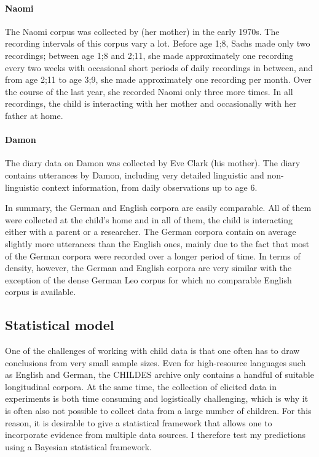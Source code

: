 \documentclass[lucida]{sp} %
\begin{document}
\paragraph{Naomi} The Naomi corpus was collected by \cite{sachs1983} (her mother) in the early 1970s. The recording intervals of this corpus vary a lot. Before age 1;8, Sachs made only two recordings; between age 1;8 and 2;11, she made approximately one recording every two weeks with occasional short periods of daily recordings in between, and from age 2;11 to age 3;9, she made approximately one recording per month. Over the course of the last year, she recorded Naomi only three more times. In all recordings, the child is interacting with her mother and occasionally with her father at home.

\paragraph{Damon} The diary data on Damon was collected by Eve Clark (his mother). The diary contains utterances by Damon, including very detailed linguistic and non-linguistic context information, from daily observations up to age 6.


\vspace{1em}
In summary, the German and English corpora are easily comparable. All of them were collected at the child's home and in all of them, the child is interacting either with a parent or a researcher. The German corpora contain on average slightly more utterances than the English ones, mainly due to the fact that most of the German corpora were recorded over a longer period of time. In terms of density, however, the German and English corpora are very similar with the exception of the dense German Leo corpus for which no comparable English corpus is available. 



\subsection{Statistical model}



One of the challenges of working with child data is that one often has to draw conclusions from very small sample sizes. Even for high-resource languages such as English and German, the CHILDES archive only contains a handful of suitable longitudinal corpora. At the same time, the collection of elicited data in experiments is both time consuming and logistically challenging, which is why it is often also not possible to collect data from a large number of children. For this reason, it is desirable to give a statistical framework that allows one to incorporate evidence from multiple data sources. I therefore test my predictions using a Bayesian statistical framework. 
\end{document}
